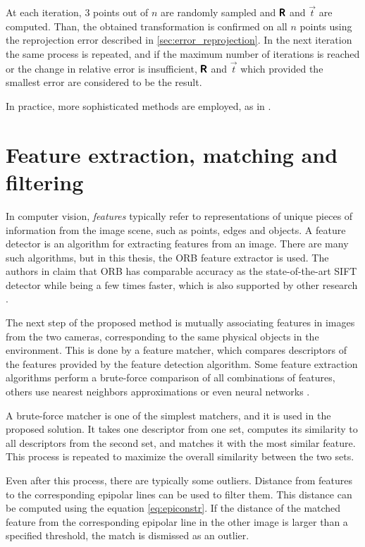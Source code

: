 At each iteration, 3 points out of $n$ are randomly sampled and $\pmb{\mathsf{R}}$ and $\vec{t}$ are computed.
Than, the obtained transformation is confirmed on all $n$ points using the reprojection error described in \autoref{sec:error_reprojection}.
In the next iteration the same process is repeated, and if the maximum number of iterations is reached or the change in relative error is insufficient, $\pmb{\mathsf{R}}$ and $\vec{t}$ which provided the smallest error are considered to be the result.

In practice, more sophisticated methods are employed, as in \cite{Lepetit2008, Hesch2011}.

\section{Feature extraction, matching and filtering}
\label{sec:features}
In computer vision, \textit{features} typically refer to representations of unique pieces of information from the image scene, such as points, edges and objects.
A feature detector is an algorithm for extracting features from an image.
There are many such algorithms, but in this thesis, the ORB feature extractor is used. 
The authors in \cite{Rublee2011} claim that ORB has comparable accuracy as the state-of-the-art SIFT detector while being a few times faster, which is also supported by other research \cite{Sharif2017}. 

The next step of the proposed method is mutually associating features in images from the two cameras, corresponding to the same physical objects in the environment. 
This is done by a feature matcher, which compares descriptors of the features provided by the feature detection algorithm.
Some feature extraction algorithms perform a brute-force comparison of all combinations of features, others use nearest neighbors approximations or even neural networks \cite{Sarlin2020}.

A brute-force matcher is one of the simplest matchers, and it is used in the proposed solution.
It takes one descriptor from one set, computes its similarity to all descriptors from the second set, and matches it with the most similar feature. 
This process is repeated to maximize the overall similarity between the two sets.

Even after this process, there are typically some outliers.
Distance from features to the corresponding epipolar lines can be used to filter them. 
This distance can be computed using the equation \eqref{eq:epiconstr}.
If the distance of the matched feature from the corresponding epipolar line in the other image is larger than a specified threshold, the match is dismissed as an outlier.

